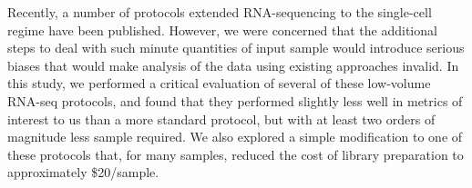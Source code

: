 Recently, a number of protocols extended RNA-sequencing to the single-cell regime have been published.  However, we were concerned that the additional steps to deal with such minute quantities of input sample would introduce serious biases that would make analysis of the data using existing approaches invalid.  In this study, we performed a critical evaluation of several of these low-volume RNA-seq protocols, and found that they performed slightly less well in metrics of interest to us than a more standard protocol, but with at least two orders of magnitude less sample required. We also explored a simple modification to one of these protocols that, for many samples, reduced the cost of library preparation to approximately \$20/sample.